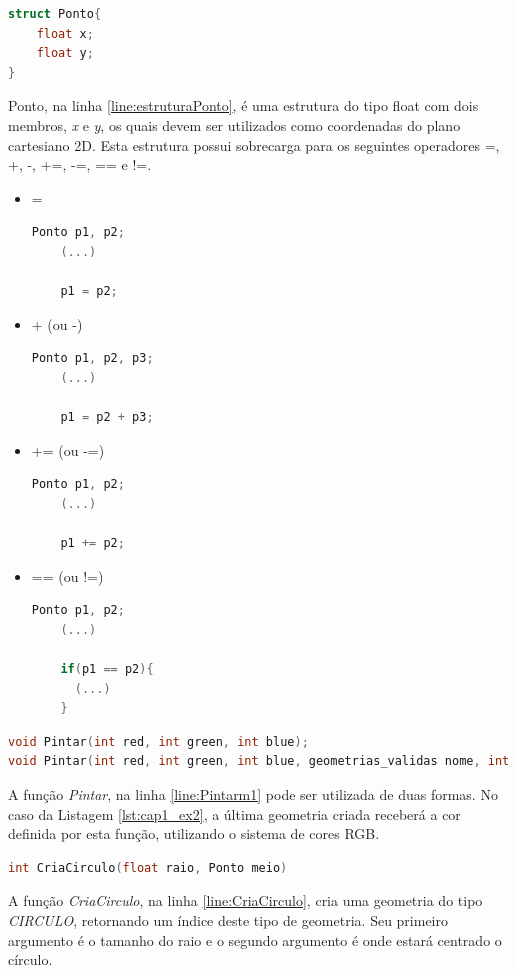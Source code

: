 \begin{lstlisting}[label={func:Ponto},language=C++]
struct Ponto{
    float x;
    float y;
}
\end{lstlisting}
Ponto, na linha \ref{line:estruturaPonto}, é uma estrutura do tipo float com dois membros, \emph{x} e \emph{y}, os quais devem ser utilizados como coordenadas do plano cartesiano 2D. Esta estrutura possui sobrecarga para os seguintes operadores =, +, -, +=, -=, == e !=.
\begin{itemize}
  \item =
    \begin{lstlisting}[style=customc,language=C++]
    Ponto p1, p2;
    (...)

    p1 = p2;
    \end{lstlisting}
   \item + (ou -)
    \begin{lstlisting}[style=customc,language=C++]
    Ponto p1, p2, p3;
    (...)

    p1 = p2 + p3;
    \end{lstlisting} 
     \item += (ou -=)
    \begin{lstlisting}[style=customc,language=C++]
    Ponto p1, p2;
    (...)

    p1 += p2;
    \end{lstlisting}

     \item == (ou !=)
    \begin{lstlisting}[style=customc,language=C++]
    Ponto p1, p2;
    (...)

    if(p1 == p2){
      (...)
    }
    \end{lstlisting}
\end{itemize}

\begin{lstlisting}[label={func:Pintar},language=C++]
void Pintar(int red, int green, int blue); 
void Pintar(int red, int green, int blue, geometrias_validas nome, int index);
\end{lstlisting}
A função \emph{Pintar}, na linha \ref{line:Pintarm1} pode ser utilizada de duas formas. No caso da Listagem \ref{lst:cap1_ex2}, a última geometria criada receberá a cor definida por esta função, utilizando o sistema de cores RGB.


\begin{lstlisting}[label={func:CriaCirculo},language=C++]
int CriaCirculo(float raio, Ponto meio)
\end{lstlisting}
A função \emph{CriaCirculo}, na linha \ref{line:CriaCirculo}, cria uma geometria do tipo \emph{CIRCULO}, retornando um índice deste tipo de geometria. Seu primeiro argumento é o tamanho do raio e o segundo argumento é onde estará centrado o círculo.


